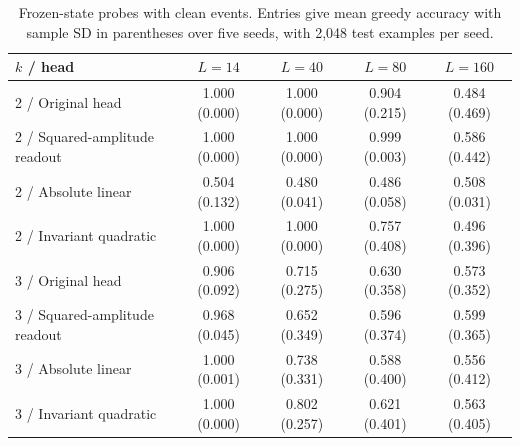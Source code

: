 \begin{table}[H]
\centering\small
\caption{Frozen-state probes with clean events. Entries give mean greedy accuracy
with sample SD in parentheses over five seeds, with 2,048 test examples per seed.}
\label{tab:newfrozenclean}
\setlength{\tabcolsep}{3pt}
\begin{tabular}{lcccc}
\toprule
$k$ / head & $L=14$ & $L=40$ & $L=80$ & $L=160$ \\
\midrule
2 / Original head & 1.000 (0.000) & 1.000 (0.000) & 0.904 (0.215) & 0.484 (0.469) \\
2 / Squared-amplitude readout & 1.000 (0.000) & 1.000 (0.000) & 0.999 (0.003) & 0.586 (0.442) \\
2 / Absolute linear & 0.504 (0.132) & 0.480 (0.041) & 0.486 (0.058) & 0.508 (0.031) \\
2 / Invariant quadratic & 1.000 (0.000) & 1.000 (0.000) & 0.757 (0.408) & 0.496 (0.396) \\
3 / Original head & 0.906 (0.092) & 0.715 (0.275) & 0.630 (0.358) & 0.573 (0.352) \\
3 / Squared-amplitude readout & 0.968 (0.045) & 0.652 (0.349) & 0.596 (0.374) & 0.599 (0.365) \\
3 / Absolute linear & 1.000 (0.001) & 0.738 (0.331) & 0.588 (0.400) & 0.556 (0.412) \\
3 / Invariant quadratic & 1.000 (0.000) & 0.802 (0.257) & 0.621 (0.401) & 0.563 (0.405) \\
\bottomrule
\end{tabular}
\end{table}

\FloatBarrier
